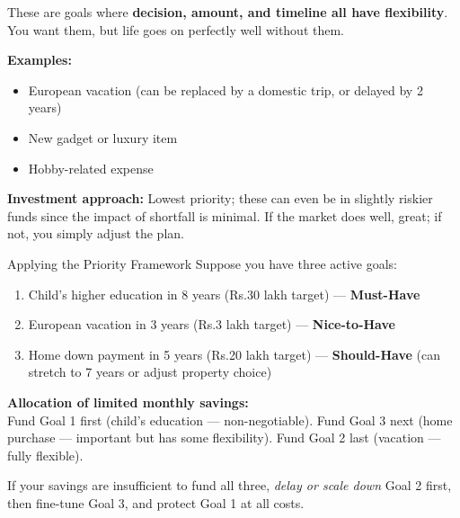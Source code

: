 \documentclass[12pt,a4paper]{article}
\makeatletter
\newcommand{\rupee}{\ifmmode\text{Rs.}\else Rs.\@\fi}
\makeatother
\begin{document}
\vspace{3mm}

\begin{tcolorbox}[base, colback=AccentTeal!8, colframe=AccentTeal,
  colbacktitle=AccentTeal, coltitle=white, fonttitle=\bfseries,
  title={Priority 3: Nice-to-Have Goals (Full Flexibility)}]

These are goals where \textbf{decision, amount, and timeline all have flexibility}. You want them, but life goes on perfectly well without them.

\medskip
\textbf{Examples:}
\begin{itemize}
  \item European vacation (can be replaced by a domestic trip, or delayed by 2 years)
  \item New gadget or luxury item
  \item Hobby-related expense
\end{itemize}

\medskip
\textbf{Investment approach:} Lowest priority; these can even be in slightly riskier funds since the impact of shortfall is minimal. If the market does well, great; if not, you simply adjust the plan.
\end{tcolorbox}

\vspace{3mm}

\begin{examplebox}{Applying the Priority Framework}
Suppose you have three active goals:
\begin{enumerate}
  \item Child's higher education in 8 years (\rupee{}30 lakh target) --- \textbf{Must-Have}
  \item European vacation in 3 years (\rupee{}3 lakh target) --- \textbf{Nice-to-Have}
  \item Home down payment in 5 years (\rupee{}20 lakh target) --- \textbf{Should-Have} (can stretch to 7 years or adjust property choice)
\end{enumerate}

\textbf{Allocation of limited monthly savings:}\\
Fund Goal 1 first (child's education --- non-negotiable). Fund Goal 3 next (home purchase --- important but has some flexibility). Fund Goal 2 last (vacation --- fully flexible).

If your savings are insufficient to fund all three, \textit{delay or scale down} Goal 2 first, then fine-tune Goal 3, and protect Goal 1 at all costs.
\end{examplebox}
\end{document}
